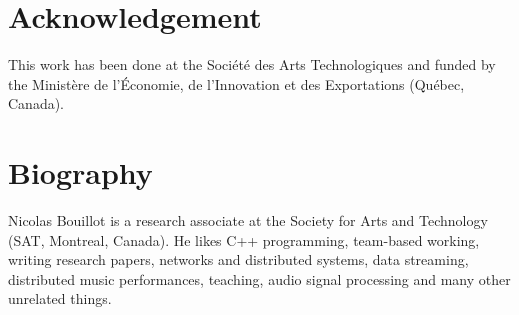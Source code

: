 \documentclass{article}
\begin{document}
\section{Acknowledgement}
This work has been done at the Société des Arts Technologiques and funded by the Ministère de l'Économie, de l'Innovation et des Exportations (Québec, Canada).



\section{Biography}
 Nicolas Bouillot is a research associate at the Society for Arts and Technology (SAT, Montreal, Canada). He likes C++ programming, team-based working, writing research papers, networks and distributed systems, data streaming, distributed music performances, teaching, audio signal processing and many other unrelated things. 
\end{document}
